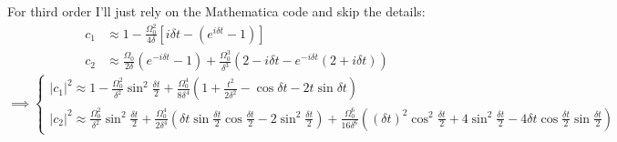 \documentclass[12pt]{article}
\newcommand{\magsq}[1]{\big|#1\big|^2}
\begin{document}
For third order I'll just rely on the Mathematica code and skip the details:
\begin{equation*}
    \begin{aligned}
        c_1 &\approx 1 - \frac{\Omega_0^2}{4\delta}\left[i\delta t - \left(e^{i\delta t} - 1\right)\right] \\
        c_2 &\approx \frac{\Omega_0}{2\delta}\left(e^{-i\delta t} - 1\right) + \frac{\Omega_0^3}{\delta^3}\left(2 - i\delta t - e^{-i\delta t}\left(2 + i\delta t\right)\right)
    \end{aligned}
\end{equation*}
\begin{equation*}
    \implies
    \begin{cases*}
        \magsq{c_1} \approx 1 - \frac{\Omega_0^2}{\delta^2}\sin^2\frac{\delta t}{2} + \frac{\Omega_0^4}{8\delta^4}\left(1 + \frac{t^2}{2\delta^2} - \cos\delta t - 2t\sin\delta t\right)  \\
        \magsq{c_2} \approx \frac{\Omega_0^2}{\delta^2}\sin^2\frac{\delta t}{2} + \frac{\Omega_0^4}{2\delta^4}\left(\delta t\sin\frac{\delta t}{2}\cos\frac{\delta t}{2} - 2\sin^2\frac{\delta t}{2}\right) + \frac{\Omega_0^6}{16\delta^6}\left((\delta t)^2\cos^2\frac{\delta t}{2} + 4\sin^2\frac{\delta t}{2}-4\delta t\cos\frac{\delta t}{2}\sin\frac{\delta t}{2}\right)
    \end{cases*}
\end{equation*}
\end{document}

